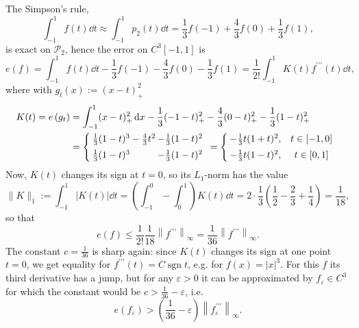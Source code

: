 \documentclass[a4paper]{article}
\renewcommand{\epsilon}{\varepsilon}
\begin{document}
\begin{example}
    The Simpson's rule,
\[
\int_{-1}^1 f(t) \dd{t} \approx \int_{-1}^1 p_2(t) \dd{t}=\frac{1}{3} f(-1)+\frac{4}{3} f(0)+\frac{1}{3} f(1),
\]
is exact on $\mathcal{P}_2$, hence the error on $C^3[-1,1]$ is
\[
e(f)=\int_{-1}^1 f(t) \dd{t}-\frac{1}{3} f(-1)-\frac{4}{3} f(0)-\frac{1}{3} f(1)=\frac{1}{2 !} \int_{-1}^1 K(t) f^{\prime \prime \prime}(t) \dd{t},
\]
where with $g_t(x):=(x-t)_{+}^2$
\[
\begin{aligned}
K(t)=e\left(g_t\right) & =\int_{-1}^1(x-t)_{+}^2 \dd{x}-\frac{1}{3}(-1-t)_{+}^2-\frac{4}{3}(0-t)_{+}^2-\frac{1}{3}(1-t)_{+}^2 \\
& =\left\{\hspace*{-.3em}\begin{array}{ll}
\frac{1}{3}(1-t)^3-\frac{4}{3} t^2&\hspace*{-.8em}-\frac{1}{3}(1-t)^2 \\[.5em]
\frac{1}{3}(1-t)^3 &\hspace*{-.8em} -\frac{1}{3}(1-t)^2
\end{array}=\left\{\hspace*{-.3em}\begin{array}{cc}
-\frac{1}{3} t(1+t)^2, & t \in[-1,0] \\[.5em]
-\frac{1}{3} t(1-t)^2, & t \in[0,1]
\end{array}\right.\right.
\end{aligned}
\]
Now, $K(t)$ changes its sign at $t=0$, so its $L_1$-norm has the value
\[
\|K\|_1:=\int_{-1}^1|K(t)| \dd{t}=\left(\int_{-1}^0-\int_0^1\right) K(t) \dd{t}=2 \cdot \frac{1}{3}\left(\frac{1}{2}-\frac{2}{3}+\frac{1}{4}\right)=\frac{1}{18},
\]
so that
\[
e(f) \leq \frac{1}{2 !} \frac{1}{18}\left\|f^{\prime \prime \prime}\right\|_{\infty}=\frac{1}{36}\left\|f^{\prime \prime \prime}\right\|_{\infty} .
\]
The constant $c=\frac{1}{36}$ is sharp again: since $K(t)$ changes its sign at one point $t=0$, we get equality for $f^{\prime \prime \prime}(t)=C \operatorname{sgn} t$, e.g. for $f(x)=|x|^3$. For this $f$ its third derivative has a jump, but for any $\epsilon>0$ it can be approximated by $f_\epsilon \in C^3$ for which the constant would be $c>\frac{1}{36}-\epsilon$, i.e.
\[
e\left(f_\epsilon\right)>\left(\frac{1}{36}-\epsilon\right)\left\|f_\epsilon^{\prime \prime \prime}\right\|_{\infty} .
\]
\end{example}
\end{document}
